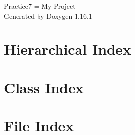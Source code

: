 \documentclass[twoside]{book}
\newcommand{\+}{\discretionary{\mbox{\scriptsize$\hookleftarrow$}}{}{}}
\newcommand{\clearemptydoublepage}{%
    \newpage{\pagestyle{empty}\cleardoublepage}%
  }
\begin{document}
  \raggedbottom
    \hypersetup{pageanchor=false,
                bookmarksnumbered=true,
                pdfencoding=unicode
               }
  \begin{titlepage}
  \vspace*{7cm}
  \begin{center}%
  {\Large Practice7         = My Project}\\
  \vspace*{1cm}
  {\large Generated by Doxygen 1.16.1}\\
  \end{center}
  \end{titlepage}
  \clearemptydoublepage
  \tableofcontents
  \clearemptydoublepage
  \hypersetup{pageanchor=true}
\chapter{Hierarchical Index}

\chapter{Class Index}

\chapter{File Index}

\end{document}

